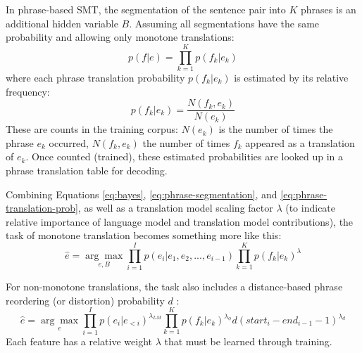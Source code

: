 In phrase-based SMT, the segmentation of the sentence pair into $K$ phrases is an additional hidden variable $B$. Assuming all segmentations have the same probability and allowing only monotone translations:
\begin{equation} \label{eq:phrase-segmentation}
	p(f|e)=\prod_{k=1}^{K}p(f_k|e_k)
\end{equation}
where each phrase translation probability $p(f_k|e_k)$ is estimated by its relative frequency:
\begin{equation} \label{eq:phrase-translation-prob}
	p(f_k|e_k)=\frac{N(f_k,e_k)}{N(e_k)}
\end{equation}
These are counts in the training corpus: $N(e_k)$ is the number of times the phrase $e_k$ occurred, $N(f_k,e_k)$ the number of times $f_k$ appeared as a translation of $e_k$. Once counted (trained), these estimated probabilities are looked up in a phrase translation table for decoding.

Combining Equations \ref{eq:bayes}, \ref{eq:phrase-segmentation}, and \ref{eq:phrase-translation-prob}, as well as a translation model scaling factor $\lambda$ (to indicate relative importance of language model and translation model contributions), the task of monotone translation becomes something more like this:
\begin{equation} \label{eq:stat-mt-summary}
	\hat{e}=\underset{e,B}{\arg\!\max}{\prod_{i=1}^{I}p(e_i|e_1,e_2,...,e_{i-1}) \prod_{k=1}^{K}p(f_k|e_k)^\lambda}
\end{equation}

For non-monotone translations, the task also includes a distance-based phrase reordering (or distortion) probability $d$ \citep{koehn2009statistical}:
\begin{equation} \label{eq:stat-mt-distortion-summary}
	\hat{e}=\underset{e}{\arg\!\max}{\prod_{i=1}^{I}p(e_i|e_{<i})^{\lambda_{LM}} \prod_{k=1}^{K}p(f_k|e_k)^{\lambda_{\phi}}}d(start_i-end_{i-1}-1)^{\lambda_{d}}
\end{equation}
Each feature has a relative weight $\lambda$ that must be learned through training.



